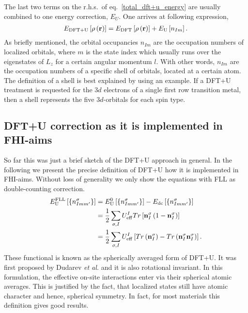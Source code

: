 The last two terms on the r.h.s.\ of eq.\ \ref{total_dft+u_energy} are usually combined to one energy correction, $E_{U}$. One arrives at following expression,
   \begin{align}
   \label{general_pu}
      E_{\rm DFT+U} \left[ \rho\left( \mathbf{r}\right) \right] = E_{\rm DFT} \left[ \rho\left( \mathbf{r}\right) \right] + E_{\rm U}\left[  n_{Im} \right].
   \end{align}
As briefly mentioned, the orbital occupancies $n_{Im}$ are the occupation numbers of localized orbitals, where $m$ is the state index which usually runs over the eigenstates of $L_z$ for a certain angular momentum $l$. With other words, $n_{Im}$ are the occupation numbers of a specific shell of orbitals, located at a certain atom. The definition of a shell is best explained by using an example. If a DFT+U treatment is requested for the $3d$ electrons of a single first row transition metal, then a shell represents the five $3d$-orbitals for each spin type.
%
\subsection{ DFT+U correction as it is implemented in FHI-aims}
So far this was just a brief sketch of the DFT+U approach in general. In the following we present the precise definition of DFT+U how it is implemented in FHI-aims. Without loss of generality we only show the equations with FLL as double-counting correction.
\begin{align}
\label{FLL}
E_{\rm U}^{\rm FLL}\left[ \left\lbrace n^{\sigma}_{Imm'}\right\rbrace \right]\nonumber   &= E_{\rm U}^{\rm 0} \left[ \left\lbrace n^{\sigma}_{Imm'}\right\rbrace \right] - E_{\rm dc} \left[ \left\lbrace n^{\sigma}_{Imm'}\right\rbrace \right] \nonumber \\ &= \frac{1}{2}\sum _{\sigma,I} U^I_{\rm eff} Tr\left[ \mathbf{n}_I^{\sigma}\left( 1 - \mathbf{n}_I^{\sigma}\right) \right] \nonumber \\ & = \frac{1}{2}\sum _{\sigma,I} U^I_{\rm eff} \left[  Tr\left(  \mathbf{n}_I^{\sigma}\right)  - Tr\left(  \mathbf{n}_I^{\sigma}\mathbf{n}_I^{\sigma}\right)\right]  .
\end{align}
These functional is known as the spherically averaged form of DFT+U. It was first proposed by Dudarev  \textit{et al.}\cite{dudarev} and it is also rotational invariant. In this formulation, the effective on-site interactions enter via their spherical atomic averages. This is justified by the fact, that localized states still have atomic character and hence, spherical symmetry. In fact, for most materials this definition gives good results.

